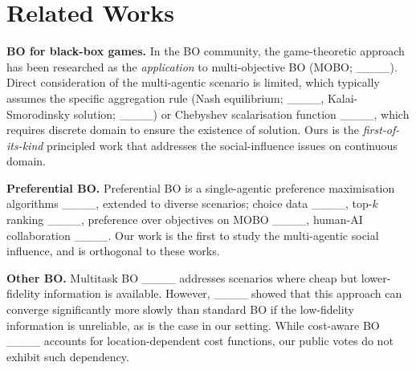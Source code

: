 \section{Related Works}
\vspace{-0.5em}

\textbf{BO for black-box games.} 
In the BO community, the game-theoretic approach has been researched as the \emph{application} to multi-objective BO (MOBO; ____). Direct consideration of the multi-agentic scenario is limited, which typically assumes the specific aggregation rule (Nash equilibrium; ____, Kalai-Smorodinsky solution; ____) or Chebyshev scalarisation function ____, which requires discrete domain to ensure the existence of solution. Ours is the \emph{first-of-its-kind} principled work that addresses the social-influence issues on continuous domain.

\textbf{Preferential BO.} 
Preferential BO is a single-agentic preference maximisation algorithms ____, extended to diverse scenarios; choice data ____, top-$k$ ranking ____, preference over objectives on MOBO ____, human-AI collaboration ____. Our work is the first to study the multi-agentic social influence, and is orthogonal to these works.

\textbf{Other BO.} 
Multitask BO ____ addresses scenarios where cheap but lower-fidelity information is available. However, ____ showed that this approach can converge significantly more slowly than standard BO if the low-fidelity information is unreliable, as is the case in our setting. While cost-aware BO ____ accounts for location-dependent cost functions, our public votes do not exhibit such dependency.
\vspace{-0.5em}